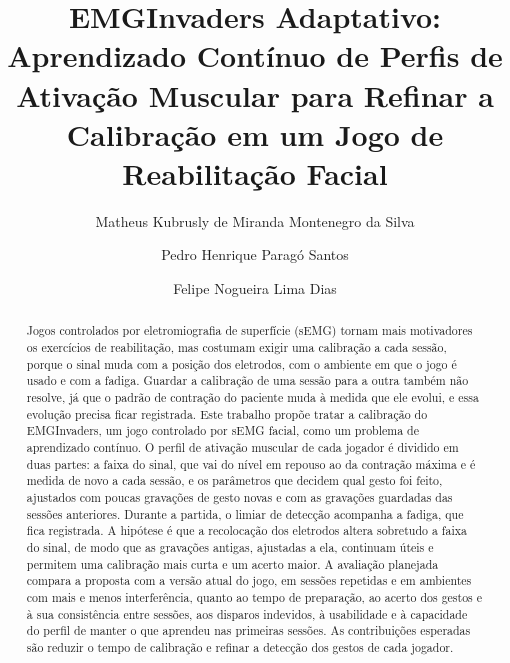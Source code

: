\documentclass[runningheads]{llncs}
\begin{document}
\title{EMGInvaders Adaptativo: Aprendizado Contínuo de Perfis de Ativação Muscular para Refinar a Calibração em um Jogo de Reabilitação Facial}

\author{Matheus Kubrusly de Miranda Montenegro da Silva \and Pedro Henrique Paragó Santos
\and Felipe Nogueira Lima Dias}
\authorrunning{~}

\maketitle

\begin{abstract}
Jogos controlados por eletromiografia de superfície (sEMG) tornam mais motivadores os exercícios de reabilitação, mas costumam exigir uma calibração a cada sessão, porque o sinal muda com a posição dos eletrodos, com o ambiente em que o jogo é usado e com a fadiga. Guardar a calibração de uma sessão para a outra também não resolve, já que o padrão de contração do paciente muda à medida que ele evolui, e essa evolução precisa ficar registrada. Este trabalho propõe tratar a calibração do EMGInvaders, um jogo controlado por sEMG facial, como um problema de aprendizado contínuo. O perfil de ativação muscular de cada jogador é dividido em duas partes: a faixa do sinal, que vai do nível em repouso ao da contração máxima e é medida de novo a cada sessão, e os parâmetros que decidem qual gesto foi feito, ajustados com poucas gravações de gesto novas e com as gravações guardadas das sessões anteriores. Durante a partida, o limiar de detecção acompanha a fadiga, que fica registrada. A hipótese é que a recolocação dos eletrodos altera sobretudo a faixa do sinal, de modo que as gravações antigas, ajustadas a ela, continuam úteis e permitem uma calibração mais curta e um acerto maior. A avaliação planejada compara a proposta com a versão atual do jogo, em sessões repetidas e em ambientes com mais e menos interferência, quanto ao tempo de preparação, ao acerto dos gestos e à sua consistência entre sessões, aos disparos indevidos, à usabilidade e à capacidade do perfil de manter o que aprendeu nas primeiras sessões. As contribuições esperadas são reduzir o tempo de calibração e refinar a detecção dos gestos de cada jogador.

\end{abstract}

\end{document}
